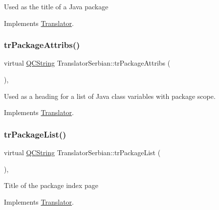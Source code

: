 Used as the title of a Java package 

Implements \mbox{\hyperlink{class_translator}{Translator}}.

\mbox{\label{class_translator_serbian_a724740f4275d46292969116d258df40f}} 
\subsubsection{\texorpdfstring{trPackageAttribs()}{trPackageAttribs()}}
{\footnotesize\ttfamily virtual \mbox{\hyperlink{class_q_c_string}{Q\+C\+String}} Translator\+Serbian\+::tr\+Package\+Attribs (\begin{DoxyParamCaption}{ }\end{DoxyParamCaption})\hspace{0.3cm}{\ttfamily [inline]}, {\ttfamily [virtual]}}

Used as a heading for a list of Java class variables with package scope. 

Implements \mbox{\hyperlink{class_translator}{Translator}}.

\mbox{\label{class_translator_serbian_ad3b63fe2281676a162859cc4efa0fb45}} 
\subsubsection{\texorpdfstring{trPackageList()}{trPackageList()}}
{\footnotesize\ttfamily virtual \mbox{\hyperlink{class_q_c_string}{Q\+C\+String}} Translator\+Serbian\+::tr\+Package\+List (\begin{DoxyParamCaption}{ }\end{DoxyParamCaption})\hspace{0.3cm}{\ttfamily [inline]}, {\ttfamily [virtual]}}

Title of the package index page 

Implements \mbox{\hyperlink{class_translator}{Translator}}.

\mbox{\label{class_translator_serbian_acd81b38e13bff89ca962a507f12757ec}} 
